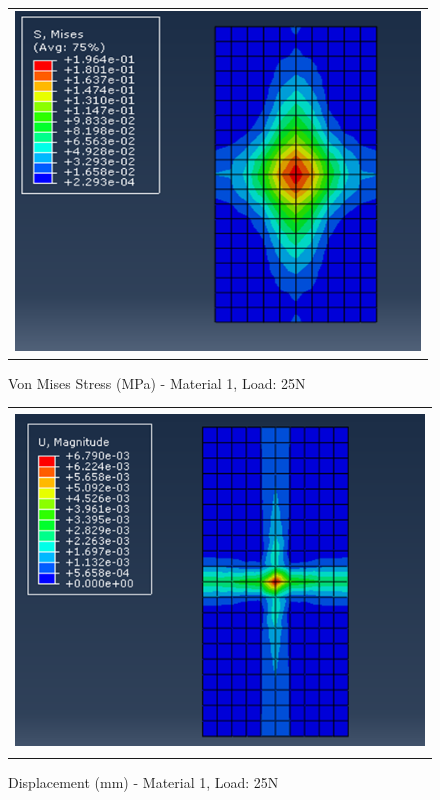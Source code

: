 \documentclass[a4paper,12pt]{article}
\numberwithin{equation}{section}
\numberwithin{figure}{section}
\begin{document}
\begin{figure}[H]
  \centering
  \begin{tabular}{@{}c@{}}
    \includegraphics[width=0.7\linewidth,height=255pt]{Results/Point Loading/M1_VMS_L5.png} \\
  \end{tabular}
  \caption{Von Mises Stress (MPa) - Material 1, Load: 25N}
\end{figure}

\begin{figure}[H]
  \centering
  \begin{tabular}{@{}c@{}}
    \includegraphics[width=0.7\linewidth,height=255pt]{Results/Point Loading/M1_DIS_L5.png} \\
  \end{tabular}
  \caption{Displacement (mm) - Material 1, Load: 25N}
\end{figure}
\end{document}
